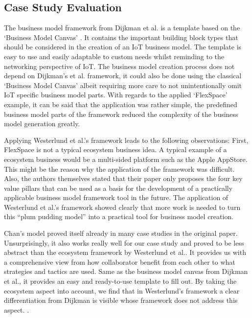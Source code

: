 	\subsection{Case Study Evaluation}
		The business model framework from Dijkman et al. \cite{dijkman} is a template based on the `Business Model Canvas' \cite{bmc}. It contains the important building block types that should be considered in the creation of an IoT business model. The template is easy to use and easily adaptable to custom needs whilst reminding to the networking perspective of IoT. The business model creation process does not depend on Dijkman's et al. framework, it could also be done using the classical `Business Model Canvas' albeit requiring more care to not unintentionally omit IoT specific business model parts.
		With regards to the applied `FlexSpace' example, it can be said that the application was rather simple, the predefined business model parts of the framework reduced the complexity of the business model generation greatly.

		Applying Westerlund et al.'s framework leads to the following observations: First, FlexSpace is not a typical ecosystem business idea. A typical example of a ecosystem business would be a multi-sided platform such as the Apple AppStore. This might be the reason why the application of the framework was difficult. Also, the authors themselves stated that their paper only proposes the four key value pillars that can be used as a basis for the development of a practically applicable business model framework tool in the future. The application of Westerlund et al.'s framework showed clearly that more work is needed to turn this ``plum pudding model'' \cite[p. 10]{westerlund} into a practical tool for business model creation.

		Chan's model proved itself already in many case studies in the original paper. Unsurprisingly, it also works really well for our case study and proved to be less abstract than the ecosystem framework by Westerlund et al.. It provides us with a comprehensive view from how collaborator benefit from each other to what strategies and tactics are used. Same as the business model canvas from Dijkman et al., it provides an easy and ready-to-use template to fill out. By taking the ecosystem aspect into account, we find that in Westerlund's framework a clear differentiation from Dijkman is visible whose framework does not address this aspect.  \cite{westerlund}.


